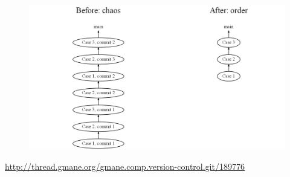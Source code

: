 \documentclass[10pt, a5paper]{article}
\begin{document}
\begin{figure}[h!]
  \centering
  \includegraphics[scale=0.2]{02_2014_before-vs-after.png}
\end{figure}

\begin{thebibliography}{9}
 \url{http://thread.gmane.org/gmane.comp.version-control.git/189776}
\end{thebibliography}
\end{document}
